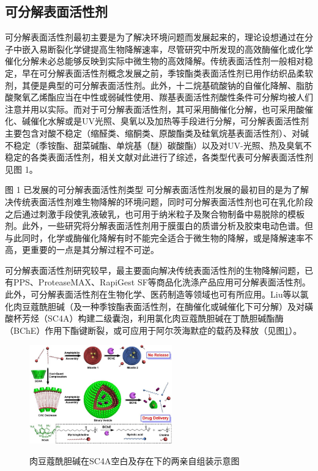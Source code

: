 \documentclass[bachelor,winfonts]{jnuthesis}
\begin{document}
    \subsection{可分解表面活性剂}
    可分解表面活性剂最初主要是为了解决环境问题而发展起来的，理论设想通过在分子中嵌入易断裂化学键提高生物降解速率，尽管研究中所发现的高效酶催化或化学催化分解未必总能够反映到实际中微生物的高效降解\cite{tehrani2007}。传统表面活性剂一般相对稳定，早在可分解表面活性剂概念发展之前，季铵酯类表面活性剂已用作纺织品柔软剂，其便是典型的可分解表面活性剂。此外，十二烷基硫酸钠的自催化降解、脂肪酸聚氧乙烯酯应当在中性或弱碱性使用、羰基表面活性剂酸性条件可分解均被人们注意并用以实际\cite{tehrani2007}。而对于可分解表面活性剂，其可采用酶催化分解，也可采用酸催化、碱催化水解或是UV光照、臭氧以及加热等手段进行分解，可分解表面活性剂主要包含对酸不稳定（缩醛类、缩酮类、原酸酯类及硅氧烷基表面活性剂）、对碱不稳定（季铵酯、甜菜碱酯、单烷基（醚）碳酸酯）以及对UV-光照、热及臭氧不稳定的各类表面活性剂，相关文献\cite{hellberg2000,tehrani2007,shukla2010,narayanan2008}对此进行了综述，各类型代表可分解表面活性剂见图 1。
    
    
    
    图 1 已发展的可分解表面活性剂类型
    可分解表面活性剂发展的最初目的是为了解决传统表面活性剂难生物降解的环境问题，同时可分解表面活性剂也可在乳化阶段之后通过刺激手段使乳液破乳，也可用于纳米粒子及聚合物制备中易脱除的模板剂\cite{liu2007}。此外，一些研究将分解表面活性剂用于膜蛋白的质谱分析\cite{norris2003}及胶束电动色谱\cite{stanley2012}。但与此同时，化学或酶催化降解有时不能完全适合于微生物的降解\cite{tehrani2007}，或是降解速率不高，更重要的一点是其分解过程不可逆\cite{liu2007}。
    
    可分解表面活性剂研究较早，最主要面向解决传统表面活性剂的生物降解问题，已有PPS、ProteaseMAX、RapiGest SF等商品化洗涤产品应用可分解表面活性剂。此外，可分解表面活性剂在生物化学、医药制造等领域也可有所应用\cite{hellberg2000}。Liu等\cite{guo2012}以氯化肉豆蔻酰胆碱（及一种季铵酯表面活性剂，在酶催化或碱催化下可分解）及对磺酸杯芳烃（SC4A）构建二级囊泡，利用氯化肉豆蔻酰胆碱在丁酰胆碱酯酶（BChE）作用下酯键断裂，或可应用于阿尔茨海默症的载药及释放（见图\ref{fig:Ch1-SC4A}）。
    
    \begin{figure}[htbp]
        \centering
        \includegraphics[width= 0.55\textwidth]{Figure/Ch1-SC4A}\\
        \caption{肉豆蔻酰胆碱在SC4A空白及存在下的两亲自组装示意图}\label{fig:Ch1-SC4A}
    \end{figure}
        
\end{document}
